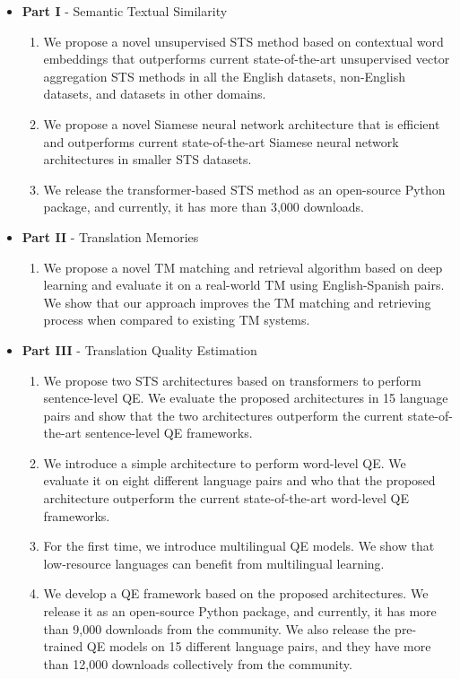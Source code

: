 \begin{itemize}
	\item \textbf{Part I} - Semantic Textual Similarity
	\begin{enumerate}
		\item We propose a novel unsupervised STS method based on contextual word embeddings that outperforms current state-of-the-art unsupervised vector aggregation STS methods in all the English datasets, non-English datasets, and datasets in other domains.
		
		\item We propose a novel Siamese neural network architecture that is efficient and outperforms current state-of-the-art Siamese neural network architectures in smaller STS datasets.  
		
		\item We release the transformer-based STS method as an open-source Python package, and currently, it has more than 3,000 downloads.
	\end{enumerate}
	
	\item \textbf{Part II} - Translation Memories
	\begin{enumerate}
		\item We propose a novel TM matching and retrieval algorithm based on deep learning and evaluate it on a real-world TM using English-Spanish pairs. We show that our approach improves the TM matching and retrieving process when compared to existing TM systems.
	\end{enumerate}
	
	\item \textbf{Part III} - Translation Quality Estimation
	\begin{enumerate}
		\item  We propose two STS architectures based on transformers to perform sentence-level QE. We evaluate the proposed architectures in 15 language pairs and show that the two architectures outperform the current state-of-the-art sentence-level QE frameworks.
		
		\item We introduce a simple architecture to perform word-level QE. We evaluate it on eight different language pairs and who that the proposed architecture outperform the current state-of-the-art word-level QE frameworks.
		
		\item For the first time, we introduce multilingual QE models. We show that low-resource languages can benefit from multilingual learning.
		
		\item We develop a QE framework based on the proposed architectures. We release it as an open-source Python package, and currently, it has more than 9,000 downloads from the community. We also release the pre-trained QE models on 15 different language pairs, and they have more than 12,000 downloads collectively from the community.
	\end{enumerate}
\end{itemize}

